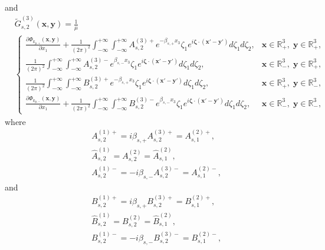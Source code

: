 \documentclass[final,reqno]{siamltex}
\newcommand{\pa}{\partial}
\newcommand{\wid}{\widetilde}
\newcommand{\mat}{\mathbb}
\newcommand{\R}{{\mat R}}
\begin{document}
and 
\begin{align*}
&\wid G_{s,2}^{(3)}(\mathbf{x},\mathbf{y})=\frac{1}{\mu} \\
&\left\{
\begin{array}{ll}
	\displaystyle\frac{\pa\Phi_{k_{p,+}}(\mathbf{x},\mathbf{y})}{\pa x_1}+\frac{1}{(2\pi)^2}\int_{-\infty}^{+\infty}\int_{-\infty}^{+\infty}A_{s,2}^{(3)+}e^{-\beta_{s,+}x_3}\zeta_1e^{i\boldsymbol{\zeta}\cdot(\mathbf{x}'-\mathbf{y}')}d\zeta_1d\zeta_2,&\mathbf{x}\in\R^3_+,\;\mathbf{y}\in\R^3_+,\\
	\displaystyle\frac{1}{(2\pi)^2}\int_{-\infty}^{+\infty}\int_{-\infty}^{+\infty}A_{s,2}^{(3)-}e^{\beta_{s,-}x_3}\zeta_1e^{i\boldsymbol{\zeta}\cdot(\mathbf{x}'-\mathbf{y}')}d\zeta_1d\zeta_2,&\mathbf{x}\in\R^3_-,\;\mathbf{y}\in\R^3_+, \\
	\displaystyle\frac{1}{(2\pi)^2}\int_{-\infty}^{+\infty}\int_{-\infty}^{+\infty}B_{s,2}^{(3)+}e^{-\beta_{s,+}x_3}\zeta_1e^{i\boldsymbol{\zeta}\cdot(\mathbf{x}'-\mathbf{y}')}d\zeta_1d\zeta_2,&\mathbf{x}\in\R^3_+,\;\mathbf{y}\in\R^3_-, \\
	\displaystyle\frac{\pa\Phi_{k_{p,-}}(\mathbf{x},\mathbf{y})}{\pa x_1}+\frac{1}{(2\pi)^2}\int_{-\infty}^{+\infty}\int_{-\infty}^{+\infty}B_{s,2}^{(3)-}e^{\beta_{s,-}x_3}\zeta_1e^{i\boldsymbol{\zeta}\cdot(\mathbf{x}'-\mathbf{y}')}d\zeta_1d\zeta_2,&\mathbf{x}\in\R^3_-,\;\mathbf{y}\in\R^3_-, 
\end{array}
\right.
\end{align*}
where 
\begin{align*}
  &A_{s,2}^{(1)+}=i\beta_{s,+}A_{s,2}^{(3)+}=A_{s,1}^{(2)+}, \\
  &\hat A_{s,2}^{(1)}=A_{s,2}^{(2)}=\hat A_{s,1}^{(2)}, \\
  &A_{s,2}^{(1)-}=-i\beta_{s,-}A_{s,2}^{(3)-}=A_{s,1}^{(2)-}, 
\end{align*}
and 
\begin{align*}
  &B_{s,2}^{(1)+}=i\beta_{s,+}B_{s,2}^{(3)+}=B_{s,1}^{(2)+}, \\
  &\hat B_{s,2}^{(1)}=B_{s,2}^{(2)}=\hat B_{s,1}^{(2)}, \\
  &B_{s,2}^{(1)-}=-i\beta_{s,-}B_{s,2}^{(3)-}=B_{s,1}^{(2)-}, 
\end{align*}
\end{document}
